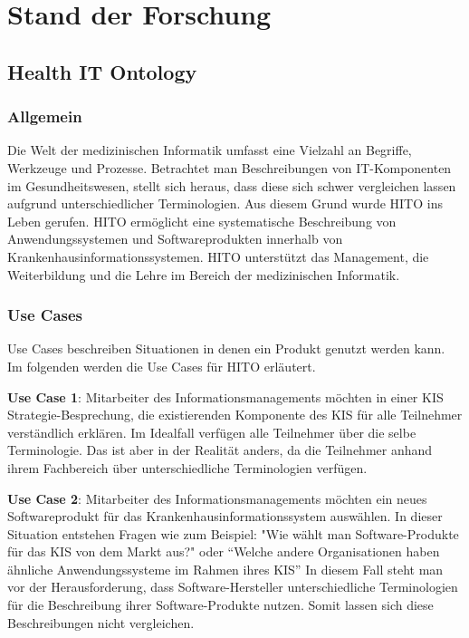 \chapter{Stand der Forschung}\label{ch:relatedWork}

\section{Health IT Ontology}

\subsection{Allgemein}

Die Welt der medizinischen Informatik umfasst eine Vielzahl an Begriffe, Werkzeuge und Prozesse. 
Betrachtet man Beschreibungen von IT-Komponenten im Gesundheitswesen, stellt sich heraus, dass diese sich schwer vergleichen lassen aufgrund unterschiedlicher Terminologien.
Aus diesem Grund wurde \ac{HITO} ins Leben gerufen.
\ac{HITO} ermöglicht eine systematische Beschreibung von Anwendungssystemen und Softwareprodukten innerhalb von Krankenhausinformationssystemen.
\ac{HITO} unterstützt das Management, die Weiterbildung und die Lehre im Bereich der medizinischen Informatik.

\subsection{Use Cases}

Use Cases beschreiben Situationen in denen ein Produkt genutzt werden kann.
Im folgenden werden die Use Cases für HITO erläutert. \newline

\textbf{Use Case 1}: Mitarbeiter des Informationsmanagements möchten in einer \ac{KIS} Strategie-Besprechung, die existierenden Komponente des \ac{KIS} für alle Teilnehmer verständlich erklären.
Im Idealfall verfügen alle Teilnehmer über die selbe Terminologie.
Das ist aber in der Realität anders, da die Teilnehmer anhand ihrem Fachbereich über unterschiedliche Terminologien verfügen. \newline

\textbf{Use Case 2}:  Mitarbeiter des Informationsmanagements möchten ein neues Softwareprodukt für das Krankenhausinformationssystem auswählen.
 In dieser Situation entstehen Fragen wie zum Beispiel: "Wie wählt man Software-Produkte für das \ac{KIS} von dem Markt aus?" oder \enquote{Welche andere Organisationen haben ähnliche Anwendungssysteme im Rahmen ihres \ac{KIS}}
 In diesem Fall steht man vor der Herausforderung, dass Software-Hersteller unterschiedliche Terminologien für die Beschreibung ihrer Software-Produkte nutzen.
 Somit lassen sich diese Beschreibungen nicht vergleichen. \newline

